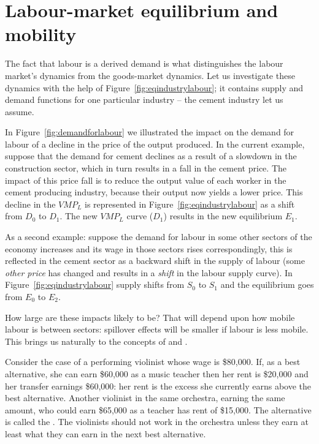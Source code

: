 \section{Labour-market equilibrium and mobility}\label{sec:ch12sec4}

The fact that labour is a derived demand is what distinguishes the labour market's dynamics from the goods-market dynamics. Let us investigate these dynamics with the help of Figure~\ref{fig:eqindustrylabour}; it contains supply and demand functions for one particular industry -- the cement industry let us assume.



In Figure~\ref{fig:demandforlabour} we illustrated the impact on the demand for labour of a decline in the price of the output produced. In the current example, suppose that the demand for cement declines as a result of a slowdown in the construction sector, which in turn results in a fall in the cement price. The impact of this price fall is to reduce the output value of each worker in the cement producing industry, because their output now yields a lower price.  This decline in the $VMP_L$ is represented in Figure~\ref{fig:eqindustrylabour} as a shift from $D_0$ to $D_1$. The new $VMP_L$ curve ($D_1$) results in the new equilibrium $E_1$. 

As a second example: suppose the demand for labour in some other sectors of the economy increases and its wage in those sectors rises correspondingly, this is reflected in the cement sector as a backward shift in the supply of labour (some \textit{other price} has changed and results in a \textit{shift} in the labour supply curve). In Figure~\ref{fig:eqindustrylabour} supply shifts from $S_0$ to $S_1$ and the equilibrium goes from $E_0$ to $E_2$.

How large are these impacts likely to be? That will depend upon how mobile labour is between sectors: spillover effects will be smaller if labour is less mobile. This brings us naturally to the concepts of  and .

Consider the case of a performing violinist whose wage is \$80,000. If, as a best alternative, she can earn \$60,000 as a music teacher then her rent is \$20,000 and her transfer earnings \$60,000: her rent is the excess she currently earns above the best alternative. Another violinist in the same orchestra, earning the same amount, who could earn \$65,000 as a teacher has rent of \$15,000. The alternative is called the . The violinists should not work in the orchestra unless they earn at least what they can earn in the next best alternative.

